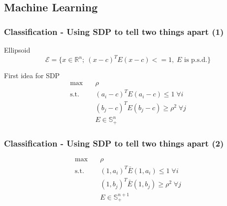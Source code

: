 \documentclass[11pt]{beamer}
\begin{document}
	
\subsection{Machine Learning}
\begin{frame}
	\frametitle{Classification - Using SDP to tell two things apart (1)}
	\begin{block}{Ellipsoid}
		\begin{equation*}
			\mathcal{E}=\{x\in\mathbb{R}^n;\:(x-c)^TE(x-c)<=1,\;E \text{ is p.s.d.}\}
		\end{equation*}
	\end{block}
	\begin{block}{First idea for SDP}
		\begin{equation*}
		\begin{aligned}
		\max\quad& \rho\\
		\text{s.t.}\quad&(a_i-c)^TE(a_i-c)\leq 1\;\forall i\\
		&(b_j-c)^TE(b_j-c)\geq \rho^2\;\forall j\\
		& E\in\mathbb{S}^n_+
		\end{aligned}
		\end{equation*}
	\end{block}
\end{frame}
\begin{frame}
	\frametitle{Classification - Using SDP to tell two things apart (2)}
	\begin{equation*}
	\begin{aligned}
	\max\quad& \rho\\
	\text{s.t.}\quad&(1,a_i)^T\bar{E}(1,a_i)\leq 1\;\forall i\\
	&(1,b_j)^T\bar{E}(1,b_j)\geq \rho^2\;\forall j\\
	& E\in\mathbb{S}^{n+1}_+
	\end{aligned}
	\end{equation*}
\end{frame}
\end{document}
